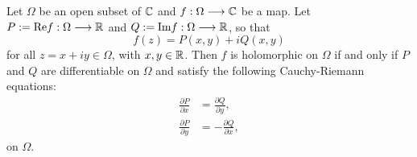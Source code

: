 \begin{corollary}
  Let $\Omega$ be an open subset of $\mathbb{C} $ and $ f : \Omega \longrightarrow \mathbb{C}  $ be a map. Let 
  $P := \text{Re}  f :  \Omega\longrightarrow  \mathbb{R} $ and $Q := \text{Im}  f :  \Omega\longrightarrow  \mathbb{R} $, so that
  \[
  f(z)  = P(x, y)  + i Q(x, y)
  \]
  for all $z = x + iy \in  \Omega$, with $x,y \in   \mathbb{R} $. Then $f$ is holomorphic on $\Omega$ if and only if $P$ 
  and $Q$ are differentiable on $\Omega$ and satisfy the following Cauchy-Riemann equations:
  \begin{align*}
    \frac{\partial P}{\partial x}  &= \frac{\partial Q}{\partial y}, \\
    \frac{\partial P}{\partial y}  &= - \frac{\partial Q}{\partial x},
  \end{align*}
  on $\Omega$.
\end{corollary}
